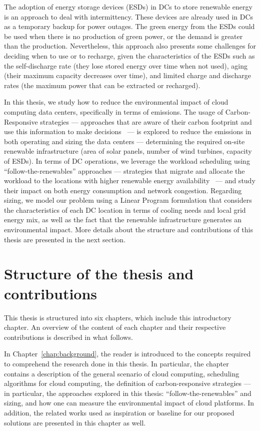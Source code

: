 The adoption of energy storage devices (ESDs) in DCs to store renewable energy~\cite{wang2012_EDCS} is an approach to deal with intermittency. These devices are already used in DCs as a temporary backup for power outages. The green energy from the ESDs could be used when there is no production of green power, or the demand is greater than the production. Nevertheless, this approach also presents some challenges for deciding when to use or to recharge, given the characteristics of the ESDs such as the self-discharge rate (they lose stored energy over time when not used), aging (their maximum capacity decreases over time), and limited charge and discharge rates (the maximum power that can be extracted or recharged).

In this thesis, we study how to reduce the environmental impact of cloud computing data centers, specifically in terms of  emissions. The usage of Carbon-Responsive strategies --- approaches that are aware of their carbon footprint and use this information to make decisions~\cite{schooler2021carbonaware} --- is explored to reduce the  emissions in both operating and sizing the data centers ---  determining the required on-site renewable infrastructure (area of solar panels, number of wind turbines, capacity of ESDs). In terms of DC operations, we leverage the workload scheduling using ``follow-the-renewables'' approaches --- strategies that migrate and allocate the workload to the locations with higher renewable energy availability~\cite{shuja2016sustainable} --- and study their impact on both energy consumption and network congestion. Regarding sizing, we model our problem using a Linear Program formulation that considers the characteristics of each DC location in terms of cooling needs and local grid energy mix, as well as the fact that the renewable infrastructure generates an environmental impact. More details about the structure and contributions of this thesis are presented in the next section.
 
\section{Structure of the thesis and contributions}

This thesis is structured into six chapters, which include this introductory chapter. An overview of the content of each chapter and their respective contributions is described in what follows.

In Chapter~\ref{chap:background}, the reader is introduced to the concepts required to comprehend the research done in this thesis. In particular, the chapter contains a description of the general scenario of cloud computing, scheduling algorithms for cloud computing, the definition of carbon-responsive strategies --- in particular, the approaches explored in this thesis: ``follow-the-renewables'' and sizing, and how one can measure the environmental impact of cloud platforms. In addition, the related works used as inspiration or baseline for our proposed solutions are presented in this chapter as well.

